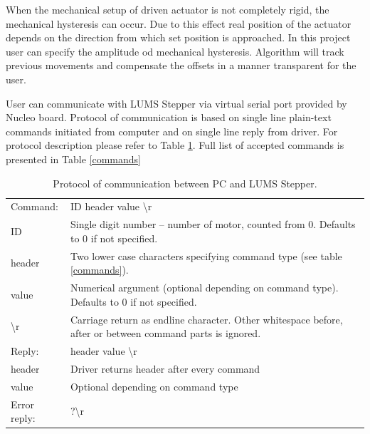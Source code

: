\documentclass[10pt,article]{article}
\begin{document}
When the mechanical setup of driven actuator is not completely rigid, the mechanical hysteresis can occur. Due to this effect real position of the  actuator depends on the direction from which set position is approached. In this project user can specify the amplitude od mechanical hysteresis. Algorithm will track previous movements and compensate the offsets in a manner transparent for the user.  

User can communicate with LUMS Stepper via virtual serial port provided by Nucleo board. Protocol of communication is based on single line plain-text commands initiated from computer and on single line reply from driver. For protocol description please refer to Table \ref{protocol}. Full list of accepted commands is presented in Table \ref{commands}

\begin{table}[ht]\centering
\begin{tabularx}{\textwidth}{lX}
\rowcolor[gray]{0.80} Command: & ID header value \textbackslash r \\
\rowcolor[gray]{0.95} ID & Single digit number – number of motor, counted from 0. Defaults to 0 if not specified.\\
\rowcolor[gray]{0.95} header & Two lower case characters specifying command type (see table \ref{commands}).\\
\rowcolor[gray]{0.95} value & Numerical argument (optional depending on command type). Defaults to 0 if not specified. \\
\rowcolor[gray]{0.95} \textbackslash r\ & Carriage return as endline character. Other whitespace before, after or between command parts is ignored. \\
\rowcolor[gray]{0.80} Reply: & header value \textbackslash r\\
\rowcolor[gray]{0.95} header & Driver returns header after every command \\
\rowcolor[gray]{0.95} value & Optional depending on command type\\
\rowcolor[gray]{0.80} Error reply: & ?\textbackslash r\\
\end{tabularx}
\caption{Protocol of communication between PC and LUMS Stepper.}\label{protocol}
\end{table}
\end{document}
